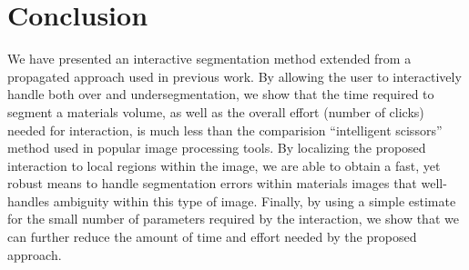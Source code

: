 \documentclass[]{spie}  %
\begin{document}
\section{Conclusion}
\label{sec:conclusion}

We have presented an interactive segmentation method extended from a
propagated approach used in previous work.  By allowing the user to
interactively handle both over and undersegmentation, we show that the
time required to segment a materials volume, as well as the overall
effort (number of clicks) needed for interaction, is much less than
the comparision ``intelligent scissors'' method used in popular image
processing tools.  By localizing the proposed interaction to local
regions within the image, we are able to obtain a fast, yet robust
means to handle segmentation errors within materials images that
well-handles ambiguity within this type of image.  Finally, by using a
simple estimate for the small number of parameters required by the
interaction, we show that we can further reduce the amount of time and
effort needed by the proposed approach.


\end{document}
